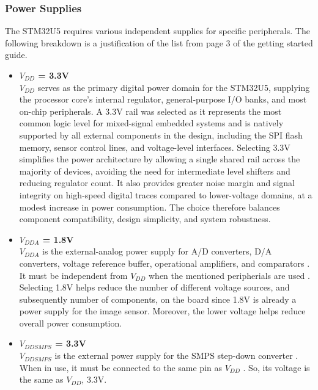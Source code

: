 \subsubsection{Power Supplies}\label{sec:app-u5-powersupply}
    The STM32U5 requires various independent supplies for specific peripherals. The following breakdown is a justification of the list from page 3 of the getting started guide.
    \begin{itemize}
        \item \textbf{$V_{DD}$ = 3.3V} \\
        $V_{DD}$ serves as the primary digital power domain for the STM32U5, supplying the processor core's internal regulator, general-purpose I/O banks, and most on-chip peripherals. A 3.3V rail was selected as it represents the most common logic level for mixed-signal embedded systems and is natively supported by all external components in the design, including the SPI flash memory, sensor control lines, and voltage-level interfaces. 
        Selecting 3.3V simplifies the power architecture by allowing a single shared rail across the majority of devices, avoiding the need for intermediate level shifters and reducing regulator count. It also provides greater noise margin and signal integrity on high-speed digital traces compared to lower-voltage domains, at a modest increase in power consumption. The choice therefore balances component compatibility, design simplicity, and system robustness.
    
        \item \textbf{$V_{DDA}$ = 1.8V} \\
        $V_{DDA}$ is the external-analog power supply for A/D converters, D/A converters, voltage reference buffer, operational amplifiers, and comparators \cite{u5-getting-started}. It must be independent from $V_{DD}$ when the mentioned peripherials are used \cite{u5-getting-started}.
        Selecting 1.8V helps reduce the number of different voltage sources, and subsequently number of components, on the board since 1.8V is already a power supply for the image sensor. Moreover, the lower voltage helps reduce overall power consumption.

        \item \textbf{$V_{DDSMPS}$ = 3.3V} \\
        $V_{DDSMPS}$ is the external power supply for the SMPS step-down converter \cite{u5-getting-started}. When in use, it must be connected to the same pin as $V_{DD}$ \cite{u5-getting-started}. So, its voltage is the same as $V_{DD}$, 3.3V.


\end{itemize}
